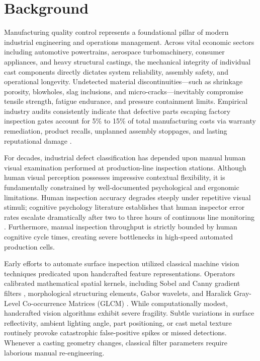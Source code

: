 \documentclass[12pt,a4paper]{report}
\begin{document}
\section{Background}
Manufacturing quality control represents a foundational pillar of modern industrial engineering and operations management. Across vital economic sectors including automotive powertrains, aerospace turbomachinery, consumer appliances, and heavy structural castings, the mechanical integrity of individual cast components directly dictates system reliability, assembly safety, and operational longevity. Undetected material discontinuities—such as shrinkage porosity, blowholes, slag inclusions, and micro-cracks—inevitably compromise tensile strength, fatigue endurance, and pressure containment limits. Empirical industry audits consistently indicate that defective parts escaping factory inspection gates account for 5\% to 15\% of total manufacturing costs via warranty remediation, product recalls, unplanned assembly stoppages, and lasting reputational damage \cite{stamatis2003failure}.

For decades, industrial defect classification has depended upon manual human visual examination performed at production-line inspection stations. Although human visual perception possesses impressive contextual flexibility, it is fundamentally constrained by well-documented psychological and ergonomic limitations. Human inspection accuracy degrades steeply under repetitive visual stimuli; cognitive psychology literature establishes that human inspector error rates escalate dramatically after two to three hours of continuous line monitoring \cite{drury2012inspection}. Furthermore, manual inspection throughput is strictly bounded by human cognitive cycle times, creating severe bottlenecks in high-speed automated production cells.

Early efforts to automate surface inspection utilized classical machine vision techniques predicated upon handcrafted feature representations. Operators calibrated mathematical spatial kernels, including Sobel and Canny gradient filters \cite{canny1986computational}, morphological structuring elements, Gabor wavelets, and Haralick Gray-Level Co-occurrence Matrices (GLCM) \cite{haralick1973textural}. While computationally modest, handcrafted vision algorithms exhibit severe fragility. Subtle variations in surface reflectivity, ambient lighting angle, part positioning, or cast metal texture routinely provoke catastrophic false-positive spikes or missed detections. Whenever a casting geometry changes, classical filter parameters require laborious manual re-engineering.
\end{document}
